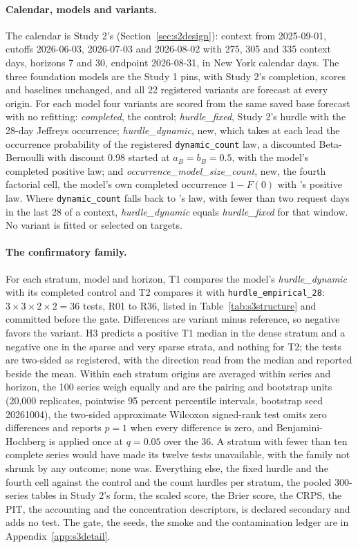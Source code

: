 \paragraph{Calendar, models and variants.} The calendar is Study 2's (Section~\ref{sec:s2design}): context
from 2025-09-01, cutoffs 2026-06-03, 2026-07-03 and 2026-08-02 with 275, 305 and 335 context days,
horizons 7 and 30, endpoint 2026-08-31, in New York calendar days. The three foundation models are the
Study 1 pins, with Study 2's completion, scores and baselines unchanged, and all 22 registered variants are
forecast at every origin. For each model four variants are scored from the same saved base forecast with
no refitting: \emph{completed}, the control; \emph{hurdle\_fixed}, Study 2's hurdle with the 28-day
Jeffreys occurrence; \emph{hurdle\_dynamic}, new, which takes at each lead the occurrence probability of the
registered \texttt{dynamic\_count} law, a discounted Beta-Bernoulli with discount 0.98 started at $a_B =
b_B = 0.5$, with the model's completed positive law; and \emph{occurrence\_model\_size\_count}, new, the
fourth factorial cell, the model's own completed occurrence $1 - F(0)$ with \hc{}'s positive law. Where
\texttt{dynamic\_count} falls back to \hc{}'s law, with fewer than two request days in the last 28 of a
context, \emph{hurdle\_dynamic} equals \emph{hurdle\_fixed} for that window. No variant is fitted or
selected on targets.

\paragraph{The confirmatory family.} For each stratum, model and horizon, T1 compares the model's
\emph{hurdle\_dynamic} with its completed control and T2 compares it with \texttt{hurdle\_empirical\_28}:
$3 \times 3 \times 2 \times 2 = 36$ \qs{} tests, R01 to R36, listed in Table~\ref{tab:s3structure} and
committed before the gate. Differences are variant minus reference, so negative favors the variant. H3
predicts a positive T1 median in the dense stratum and a negative one in the sparse and very sparse strata,
and nothing for T2; the tests are two-sided as registered, with the direction read from the median and
reported beside the mean. Within each stratum origins are averaged within series and horizon, the 100 series
weigh equally and are the pairing and bootstrap units (20,000 replicates, pointwise 95 percent percentile
intervals, bootstrap seed 20261004), the two-sided approximate Wilcoxon signed-rank test omits zero
differences and reports $p = 1$ when every difference is zero, and Benjamini-Hochberg is applied once at
$q = 0.05$ over the 36. A stratum with fewer than ten complete series would have made its twelve tests
unavailable, with the family not shrunk by any outcome; none was. Everything else, the fixed hurdle and the
fourth cell against the control and the count hurdles per stratum, the pooled 300-series tables in Study
2's form, the scaled score, the Brier score, the CRPS, the PIT, the accounting and the concentration
descriptors, is declared secondary and adds no test. The gate, the seeds, the smoke and the contamination
ledger are in Appendix~\ref{app:s3detail}.

